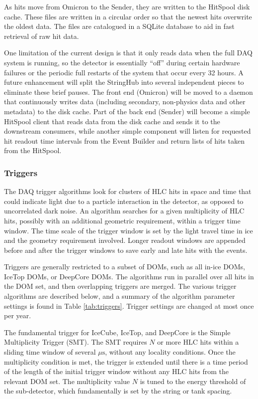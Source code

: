 As hits move from Omicron to the Sender, they are written to the
HitSpool disk cache.  These files are
written in a circular order so that the newest hits overwrite the oldest
data.  The files are catalogued in a SQLite database to
aid in fast retrieval of raw hit data.

One limitation of the current design is that it only reads data when
the full DAQ system is running, so the detector is essentially ``off''
during certain hardware failures or the periodic full restarts of the
system that occur every 32 hours.  A future enhancement 
will split the StringHub into several independent pieces to eliminate these
brief pauses.  The front end (Omicron) will be moved to a daemon
that continuously writes data (including secondary, non-physics data and
other metadata) to the disk cache.  Part of the back end (Sender) 
will become a simple HitSpool client that reads data from the disk cache
and sends it to the downstream consumers, while another simple component
will listen for requested hit readout time intervals from the Event Builder
and return lists of hits taken from the HitSpool.

\subsubsection{\label{sect:online:trigger}Triggers}

The DAQ trigger algorithms look for clusters of HLC hits in space and time
that could indicate light due to a particle interaction in the detector, as
opposed to uncorrelated dark noise.   An algorithm searches for a given
multiplicity of HLC hits, possibly with an additional geometric
requirement, within a trigger time window.  The time scale of the trigger window is
set by the light travel time in ice and the geometry requirement
involved. Longer readout windows are appended before and after the trigger
windows to save early and late hits with the events.

Triggers are generally restricted to a subset of DOMs, such as all in-ice DOMs,
IceTop DOMs, or DeepCore DOMs.  The algorithms run in parallel over all
hits in the DOM set, and then overlapping triggers are merged.  The various
trigger algorithms are described below, and a summary of the algorithm
parameter settings is found in Table \ref{tab:triggers}.  Trigger settings
are changed at most once per year.

The fundamental trigger for IceCube, IceTop, and DeepCore is the Simple
Multiplicity Trigger (SMT).  The SMT requires $N$ or more HLC hits within a
sliding time window of several $\mu\mathrm{s}$, without any locality
conditions.  Once the multiplicity condition is met, the trigger is 
extended until there is a time period of the length of the initial trigger
window without any HLC hits from the relevant DOM set.  The
multiplicity value $N$ is tuned to the energy threshold of the sub-detector,
which fundamentally is set by the string or tank spacing.

